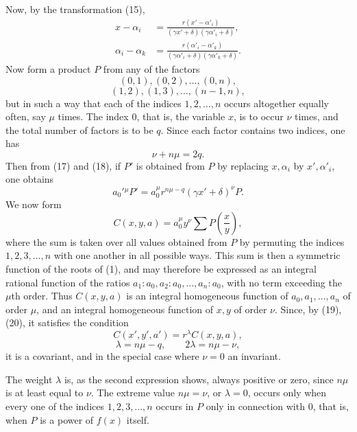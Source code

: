 \documentclass[11pt]{article}
\begin{document}
Now, by the transformation (15),
\begin{equation}
\begin{aligned}
 x-\alpha_i&=\frac{r(x'-\alpha'_i)}{(\gamma x'+\delta)(\gamma\alpha'_i+\delta)},\\
 \alpha_i-\alpha_k&=\frac{r(\alpha'_i-\alpha'_k)}{(\gamma\alpha'_i+\delta)(\gamma\alpha'_k+\delta)}.
\end{aligned}
\tag{18}
\end{equation}
Now form a product $P$ from any of the factors
\[
 (0,1),(0,2),\ldots,(0,n),
\]
\[
 (1,2),(1,3),\ldots,(n-1,n),
\]
but in such a way that each of the indices $1,2,\ldots,n$ occurs altogether equally often, say $\mu$ times. The index $0$, that is, the variable $x$, is to occur $\nu$ times, and the total number of factors is to be $q$. Since each factor contains two indices, one has
\begin{equation}
 \nu+n\mu=2q.
\tag{19}
\end{equation}
Then from (17) and (18), if $P'$ is obtained from $P$ by replacing $x,\alpha_i$ by $x',\alpha'_i$, one obtains
\begin{equation}
 a_0'{}^\mu P'=a_0^\mu r^{n\mu-q}(\gamma x'+\delta)^\nu P.
\tag{20}
\end{equation}
We now form
\begin{equation}
 C(x,y,a)=a_0^\mu y^\nu\sum P\left(\frac{x}{y}\right),
\tag{21}
\end{equation}
where the sum is taken over all values obtained from $P$ by permuting the indices $1,2,3,\ldots,n$ with one another in all possible ways. This sum is then a symmetric function of the roots of (1), and may therefore be expressed as an integral rational function of the ratios $a_1:a_0,a_2:a_0,\ldots,a_n:a_0$, with no term exceeding the $\mu$th order. Thus $C(x,y,a)$ is an integral homogeneous function of $a_0,a_1,\ldots,a_n$ of order $\mu$, and an integral homogeneous function of $x,y$ of order $\nu$. Since, by (19), (20), it satisfies the condition
\begin{equation}
 C(x',y',a')=r^\lambda C(x,y,a),
\tag{22}
\end{equation}
\begin{equation}
 \lambda=n\mu-q,
 \qquad
 2\lambda=n\mu-\nu,
\tag{23}
\end{equation}
it is a covariant, and in the special case where $\nu=0$ an invariant.

The weight $\lambda$ is, as the second expression shows, always positive or zero, since $n\mu$ is at least equal to $\nu$. The extreme value $n\mu=\nu$, or $\lambda=0$, occurs only when every one of the indices $1,2,3,\ldots,n$ occurs in $P$ only in connection with $0$, that is, when $P$ is a power of $f(x)$ itself.
\end{document}

